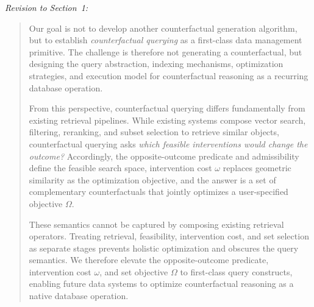 \noindent\emph{Revision to Section~1:}
\begin{quote}
{\color{blue}Our goal is not to develop another counterfactual generation algorithm, but to establish \emph{counterfactual querying} as a first-class data management primitive. The challenge is therefore not generating a counterfactual, but designing the query abstraction, indexing mechanisms, optimization strategies, and execution model for counterfactual reasoning as a recurring database operation.

From this perspective, counterfactual querying differs fundamentally from existing retrieval pipelines. While existing systems compose vector search, filtering, reranking, and subset selection to retrieve similar objects, counterfactual querying asks \emph{which feasible interventions would change the outcome?} Accordingly, the opposite-outcome predicate and admissibility define the feasible search space, intervention cost $\omega$ replaces geometric similarity as the optimization objective, and the answer is a set of complementary counterfactuals that jointly optimizes a user-specified objective $\Omega$.

These semantics cannot be captured by composing existing retrieval operators. Treating retrieval, feasibility, intervention cost, and set selection as separate stages prevents holistic optimization and obscures the query semantics. We therefore elevate the opposite-outcome predicate, intervention cost $\omega$, and set objective $\Omega$ to first-class query constructs, enabling future data systems to optimize counterfactual reasoning as a native database operation.}
\end{quote}

